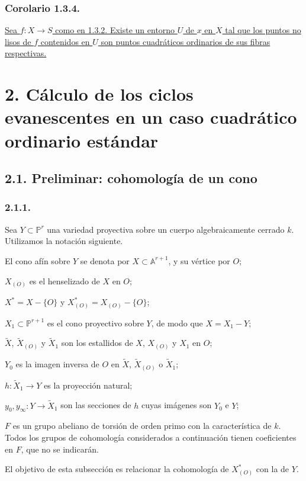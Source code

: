 \subsubsection*{Corolario 1.3.4.}
\underline{Sea $f:X\to S$ como en 1.3.2. Existe un entorno $U$ de $x$
en $X$ tal que los puntos no lisos de $f$ contenidos en $U$ son puntos
cuadráticos ordinarios de sus fibras respectivas.}

\pageoriginale

\section*[2. Ciclos evanescentes: caso cuadrático ordinario]{2. Cálculo de los ciclos evanescentes en un caso cuadrático
ordinario estándar}

\subsection*{2.1. Preliminar: cohomología de un cono}

\subsubsection*{2.1.1.}
Sea $Y\subset\mathbb P^r$ una variedad proyectiva sobre un cuerpo
algebraicamente cerrado $k$. Utilizamos la notación siguiente.

El cono afín sobre $Y$ se denota por $X\subset\mathbb A^{r+1}$, y su
vértice por $O$;

$X_{(O)}$ es el henselizado de $X$ en $O$;

$X^*=X-\{O\}$ y $X^*_{(O)}=X_{(O)}-\{O\}$;

$X_1\subset\mathbb P^{r+1}$ es el cono proyectivo sobre $Y$, de modo
que $X=X_1-Y$;

$\widetilde X$, $\widetilde X_{(O)}$ y $\widetilde X_1$ son los
estallidos de $X$, $X_{(O)}$ y $X_1$ en $O$;

$Y_0$ es la imagen inversa de $O$ en $\widetilde X$,
$\widetilde X_{(O)}$ o $\widetilde X_1$;

$h:\widetilde X_1\to Y$ es la proyección natural;

$y_0,y_\infty:Y\to\widetilde X_1$ son las secciones de $h$ cuyas
imágenes son $Y_0$ e $Y$;

$F$ es un grupo abeliano de torsión de orden primo con la
característica de $k$. Todos los grupos de cohomología considerados a
continuación tienen coeficientes en $F$, que no se indicarán.

El objetivo de esta subsección es relacionar la cohomología de
$X^*_{(O)}$ con la de $Y$.

